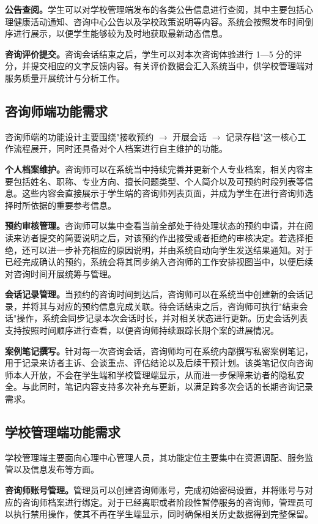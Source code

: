 \textbf{公告查阅。}学生可以对学校管理端发布的各类公告信息进行查阅，其中主要包括心理健康活动通知、咨询中心公告以及学校政策说明等内容。系统会按照发布时间倒序进行展示，以便学生能够较为及时地获取最新动态信息。

\textbf{咨询评价提交。}咨询会话结束之后，学生可以对本次咨询体验进行 1—5 分的评分，并提交相应的文字反馈内容。有关评价数据会汇入系统当中，供学校管理端对服务质量开展统计与分析工作。

\subsection{咨询师端功能需求}

咨询师端的功能设计主要围绕"接收预约 $\rightarrow$ 开展会话 $\rightarrow$ 记录存档"这一核心工作流程展开，同时还具备对个人档案进行自主维护的功能。

\textbf{个人档案维护。}咨询师可以在系统当中持续完善并更新个人专业档案，相关内容主要包括姓名、职称、专业方向、擅长问题类型、个人简介以及可预约时段列表等信息。这些内容会直接展示于学生端的咨询师列表页面，并成为学生在进行咨询师选择时所依据的重要参考信息。

\textbf{预约审核管理。}咨询师可以集中查看当前全部处于待处理状态的预约申请，并在阅读来访者提交的简要说明之后，对该预约作出接受或者拒绝的审核决定。若选择拒绝，还可以进一步补充相应的原因说明，并由系统自动向学生发送结果通知。对于已经完成确认的预约，系统会将其同步纳入咨询师的工作安排视图当中，以便后续对咨询时间开展统筹与管理。

\textbf{会话记录管理。}当预约的咨询时间到达后，咨询师可以在系统当中创建新的会话记录，并将其与对应的预约信息完成关联。待会话结束之后，咨询师可执行"结束会话"操作，系统会同步记录本次会话时长，并对相关状态进行更新。历史会话列表支持按照时间顺序进行查看，以便咨询师持续跟踪长期个案的进展情况。

\textbf{案例笔记撰写。}针对每一次咨询会话，咨询师均可在系统内部撰写私密案例笔记，用于记录来访者主诉、会谈重点、评估结论以及后续干预计划。该类笔记仅向咨询师本人开放，不会在学生端和学校管理端显示，从而进一步保障来访者的隐私安全。与此同时，笔记内容支持多次补充与更新，以满足跨多次会话的长期咨询记录需求。

\subsection{学校管理端功能需求}

学校管理端主要面向心理中心管理人员，其功能定位主要集中在资源调配、服务监管以及信息发布等方面。

\textbf{咨询师账号管理。}管理员可以创建咨询师账号，完成初始密码设置，并将账号与对应的咨询师档案进行绑定。对于已经离职或者阶段性暂停服务的咨询师，管理员可以执行禁用操作，使其不再在学生端显示，同时确保相关历史数据得到完整保留。

